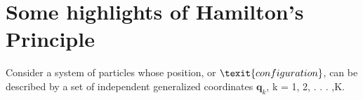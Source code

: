 
\section{Some highlights of Hamilton's Principle}
Consider a system of particles whose position, or $\texit{configuration}$, can be described by a set of independent generalized coordinates $\mathbf{q}_{k}$, k = 1, 2, . . . ,K.






